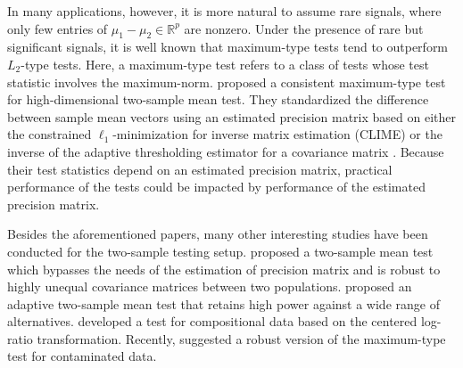 \documentclass[11pt]{article}
\newcommand{\bbR}{\mathbb{R}}
\begin{document}
In many applications, however, it is more natural to assume rare signals, where only few entries of $\mu_{1}-\mu_{2} \in \bbR^p$ are nonzero.
Under the presence of rare but significant signals, it is well known that maximum-type tests tend to outperform $L_2$-type tests.
Here, a maximum-type test refers to a class of tests whose test statistic involves the maximum-norm.
\cite{cai2014two} proposed a consistent maximum-type test for high-dimensional two-sample mean test.
They standardized the difference between sample mean vectors using an estimated precision matrix based on either the constrained $\ell_1$-minimization for inverse matrix estimation (CLIME)  \citep{cai2011constrained} or the inverse of the adaptive thresholding estimator for a covariance matrix \citep{cai2011adaptive}.
Because their test statistics depend on an estimated precision matrix,  practical performance of the tests could be impacted by performance of the estimated precision matrix.


Besides the aforementioned papers, many  other interesting studies have been conducted for the two-sample testing setup. 
\cite{gregory2015two} proposed a two-sample mean test which bypasses the needs of the estimation of precision matrix and is  robust to highly unequal covariance matrices between two populations.
\cite{xu2016adaptive} proposed an adaptive two-sample mean test that retains high power against a wide range of alternatives.
\cite{cao2018two} developed a test for compositional data based on the centered log-ratio transformation.
Recently, \cite{wang2019robust} suggested a robust version of the maximum-type test for contaminated data. 
\end{document}
